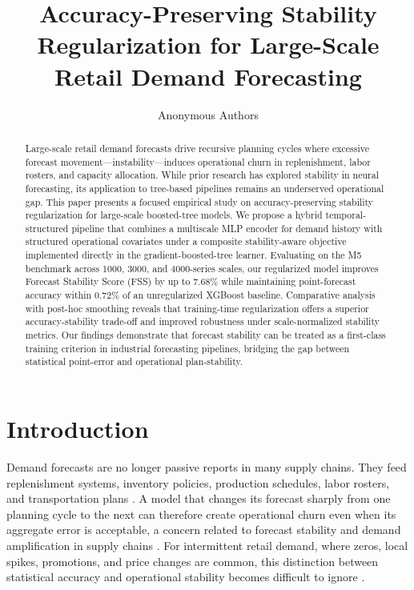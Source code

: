 \documentclass[10pt,conference]{IEEEtran}
\title{Accuracy-Preserving Stability Regularization for Large-Scale Retail Demand Forecasting}
\author{Anonymous Authors}
\begin{document}
\maketitle

\begin{abstract}
Large-scale retail demand forecasts drive recursive planning cycles where excessive forecast movement—instability—induces operational churn in replenishment, labor rosters, and capacity allocation. While prior research has explored stability in neural forecasting, its application to tree-based pipelines remains an underserved operational gap. This paper presents a focused empirical study on accuracy-preserving stability regularization for large-scale boosted-tree models. We propose a hybrid temporal-structured pipeline that combines a multiscale MLP encoder for demand history with structured operational covariates under a composite stability-aware objective implemented directly in the gradient-boosted-tree learner. Evaluating on the M5 benchmark across 1000, 3000, and 4000-series scales, our regularized model improves Forecast Stability Score (FSS) by up to 7.68\% while maintaining point-forecast accuracy within 0.72\% of an unregularized XGBoost baseline. Comparative analysis with post-hoc smoothing reveals that training-time regularization offers a superior accuracy-stability trade-off and improved robustness under scale-normalized stability metrics. Our findings demonstrate that forecast stability can be treated as a first-class training criterion in industrial forecasting pipelines, bridging the gap between statistical point-error and operational plan-stability.
\end{abstract}


\section{Introduction}
Demand forecasts are no longer passive reports in many supply chains. They feed replenishment systems, inventory policies, production schedules, labor rosters, and transportation plans \cite{fildes2008orReview,fildes2022retail,petropoulos2022forecasting}. A model that changes its forecast sharply from one planning cycle to the next can therefore create operational churn even when its aggregate error is acceptable, a concern related to forecast stability and demand amplification in supply chains \cite{lee1997bullwhip,chen2000bullwhip,godahewa2025forecastStability}. For intermittent retail demand, where zeros, local spikes, promotions, and price changes are common, this distinction between statistical accuracy and operational stability becomes difficult to ignore \cite{croston1972intermittent,syntetos2005accuracy,makridakis2022m5}.
\end{document}

